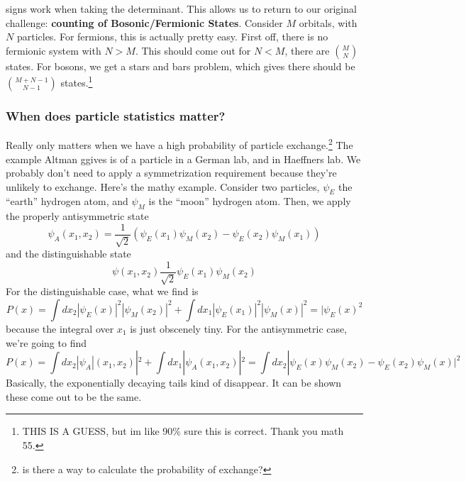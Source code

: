 \documentclass{article}
\theoremstyle{definition}
\begin{document}
signs work when taking the determinant. This allows us to return to our original challenge: \textbf{counting of Bosonic/Fermionic States}. Consider $M$ orbitals, with $N$ particles. For fermions, this is actually pretty easy. First off, there is no fermionic system with $N>M$. This should come out for $N<M$, there are $M\choose N$ states. For bosons, we get a stars and bars problem, which gives there should be $M+N-1\choose N-1$ states.\footnote{THIS IS A GUESS, but im like 90\% sure this is correct. Thank you math 55.} \subsubsection{When does particle statistics matter?} Really only matters when we have a high probability of particle exchange.\footnote{is there a way to calculate the probability of exchange?} The example Altman ggives is of a particle in a German lab, and in Haeffners lab. We probably don't need to apply a symmetrization requirement because they're unlikely to exchange. Here's the mathy example. Consider two particles, $\psi_E$ the ``earth'' hydrogen atom, and $\psi_M$ is the ``moon'' hydrogen atom. Then, we apply the properly antisymmetric state \begin{equation} \psi_A(x_1,x_2)=\frac{1}{\sqrt{2}}(\psi_E(x_1)\psi_M(x_2)-\psi_E(x_2)\psi_M(x_1)) \end{equation} and the distinguishable state \begin{equation} \psi(x_1,x_2)\frac{1}{\sqrt{2}}\psi_E(x_1)\psi_M(x_2) \end{equation} For the distinguishable case, what we find is \begin{equation} P(x)=\int dx_2|\psi_E(x)|^2|\psi_M(x_2)|^2+\int dx_1|\psi_E(x_1)|^2|\psi_M(x)|^2=|\psi_E(x)^2 \end{equation} because the integral over $x_1$ is just obscenely tiny. For the antisymmetric case, we're going to find \begin{equation} P(x)=\int dx_2|\psi_A|(x_1,x_2)|^2+\int dx_1|\psi_A(x_1,x_2)|^2=\int dx_2|\psi_E(x)\psi_M(x_2)-\psi_E(x_2)\psi_M(x)|^2 \end{equation} Basically, the exponentially decaying tails kind of disappear. It can be shown these come out to be the same.
\end{document}
